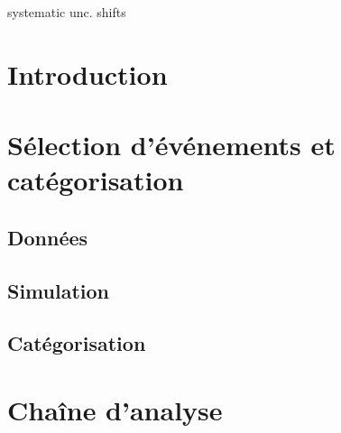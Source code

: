 systematic unc. shifts~\cite{BarlowBeeston,BarlowBeeston2}

\section{Introduction}\label{chapter-HTT_analysis-section-introduction}

\section{Sélection d'événements et catégorisation}\label{chapter-HTT_analysis-section-evt_selection}
\subsection{Données}\label{chapter-HTT_analysis-section-evt_selection-subsec-data}
\subsection{Simulation}\label{chapter-HTT_analysis-section-evt_selection-subsec-MC}
\subsection{Catégorisation}\label{chapter-HTT_analysis-section-evt_selection-subsec-categorisation}

\section{Chaîne d'analyse}\label{chapter-HTT_analysis-section-chaine_analyse}


